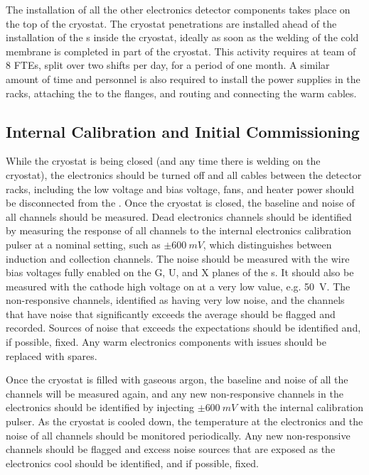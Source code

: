The installation of all the other  electronics detector components
takes place on the top of the cryostat. The cryostat penetrations are installed
ahead of the installation of the s inside the cryostat, ideally as
soon as the welding of the cold membrane is completed in part of the cryostat. 
This activity requires at team of 8 FTEs, split over two shifts per day, for a 
period of one month. A similar amount of time and personnel is also required
to install the power supplies in the racks, attaching the  to
the  flanges, and routing and connecting the warm cables.

\subsection{Internal Calibration and Initial Commissioning}
\label{sec:fdsp-tpcelec-integration-calib}

While the cryostat is being closed (and any time there is welding 
on the cryostat), the electronics should be turned off and all 
cables between the detector racks, including the low voltage
and bias voltage, fans, and heater power should be disconnected 
from the . Once the cryostat is closed, the baseline 
and noise of all channels should be measured. Dead electronics channels 
should be identified by measuring the response of all channels to 
the internal electronics calibration pulser at a nominal setting, 
such as $\pm\SI{600}{mV}$, which distinguishes between induction 
and collection channels. The noise should be measured with the wire bias 
voltages fully enabled on the G, U, and X planes of the s. 
It should also be measured with the cathode high voltage on at a very 
low value, e.g. \SI{50}{V}. The non-responsive channels, identified
as having very low noise, and the channels that have noise that 
significantly exceeds the average should be flagged and recorded.
Sources of noise that exceeds the expectations should be identified
and, if possible, fixed. Any warm electronics components with
issues should be replaced with spares.

Once the cryostat is filled with gaseous
argon, the baseline and noise of all the channels will be measured
again, and any new non-responsive channels in the electronics 
should be identified by injecting $\pm\SI{600}{mV}$ with the 
internal calibration pulser. As the cryostat is cooled down, the 
temperature at the electronics and the noise of all channels should 
be monitored periodically. Any new non-responsive channels should 
be flagged and excess noise sources that are exposed as the 
electronics cool should be identified, and if possible, fixed.

